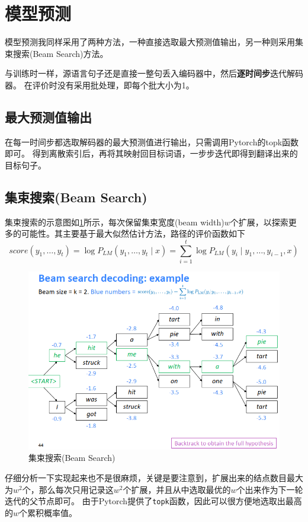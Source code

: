 \documentclass[logo,reportComp]{thesis}
\begin{document}
\section{模型预测}
模型预测我同样采用了两种方法，一种直接选取最大预测值输出，另一种则采用集束搜索(Beam Search)方法。

与训练时一样，源语言句子还是直接一整句丢入编码器中，然后\textbf{逐时间步}迭代解码器。
在评价时没有采用批处理，即每个批大小为1。

\subsection{最大预测值输出}
在每一时间步都选取解码器的最大预测值进行输出，只需调用Pytorch的topk函数即可。
得到离散索引后，再将其映射回目标词语，一步步迭代即得到翻译出来的目标句子。

\subsection{集束搜索(Beam Search)}
集束搜索的示意图如\ref{fig:beam_search}所示，每次保留集束宽度(beam width)$w$个扩展，以探索更多的可能性。其主要基于最大似然估计方法，路径的评价函数如下
\[score(y_1,\ldots,y_t)=\log P_{LM}(y_1,\ldots,y_t\mid x)=\sum_{i=1}^t\log P_{LM}(y_i\mid y_1,\ldots,y_{i-1},x)\]
\begin{figure}[H]
\centering
\includegraphics[width=0.8\linewidth]{fig/beam_search.png}
\caption{集束搜索(Beam Search)}
\label{fig:beam_search}
\end{figure}

仔细分析一下实现起来也不是很麻烦，关键是要注意到，扩展出来的结点数目最大为$w^2$个，那么每次只用记录这$w^2$个扩展，并且从中选取最优的$w$个出来作为下一轮迭代的父节点即可。
由于Pytorch提供了\verb'topk'函数，因此可以很方便地选取出最高的$w$个累积概率值。
\end{document}
